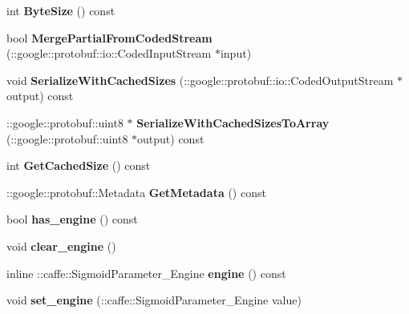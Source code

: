 \begin{DoxyCompactItemize}
int {\bfseries Byte\+Size} () const
\item 
\mbox{\label{classcaffe_1_1_sigmoid_parameter_a3b769818a6f9cd2378d40ba65a9fc220}} 
bool {\bfseries Merge\+Partial\+From\+Coded\+Stream} (\+::google\+::protobuf\+::io\+::\+Coded\+Input\+Stream $\ast$input)
\item 
\mbox{\label{classcaffe_1_1_sigmoid_parameter_a969b53b835eb34a737555d74f26e7440}} 
void {\bfseries Serialize\+With\+Cached\+Sizes} (\+::google\+::protobuf\+::io\+::\+Coded\+Output\+Stream $\ast$output) const
\item 
\mbox{\label{classcaffe_1_1_sigmoid_parameter_a6c3fa9c604e99661d5b99abaebfea61d}} 
\+::google\+::protobuf\+::uint8 $\ast$ {\bfseries Serialize\+With\+Cached\+Sizes\+To\+Array} (\+::google\+::protobuf\+::uint8 $\ast$output) const
\item 
\mbox{\label{classcaffe_1_1_sigmoid_parameter_a3689522317b24b6951310d838966d82e}} 
int {\bfseries Get\+Cached\+Size} () const
\item 
\mbox{\label{classcaffe_1_1_sigmoid_parameter_a3720acf84e28ade4974546b1fcb3b5e8}} 
\+::google\+::protobuf\+::\+Metadata {\bfseries Get\+Metadata} () const
\item 
\mbox{\label{classcaffe_1_1_sigmoid_parameter_aeba70eb092ec6c6f8a6f11cd657e143a}} 
bool {\bfseries has\+\_\+engine} () const
\item 
\mbox{\label{classcaffe_1_1_sigmoid_parameter_ab72d71d79d429c9d44caaf5b04d416d6}} 
void {\bfseries clear\+\_\+engine} ()
\item 
\mbox{\label{classcaffe_1_1_sigmoid_parameter_a021fe56984fcd91decfb9c308a2448f5}} 
inline \+::caffe\+::\+Sigmoid\+Parameter\+\_\+\+Engine {\bfseries engine} () const
\item 
\mbox{\label{classcaffe_1_1_sigmoid_parameter_a0a6e99825d8d1c37d639ecb4d7f2076a}} 
void {\bfseries set\+\_\+engine} (\+::caffe\+::\+Sigmoid\+Parameter\+\_\+\+Engine value)
\end{DoxyCompactItemize}
